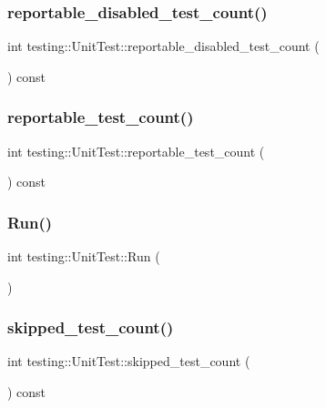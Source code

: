 \subsubsection{\texorpdfstring{reportable\+\_\+disabled\+\_\+test\+\_\+count()}{reportable\_disabled\_test\_count()}}
{\footnotesize\ttfamily int testing\+::\+Unit\+Test\+::reportable\+\_\+disabled\+\_\+test\+\_\+count (\begin{DoxyParamCaption}{ }\end{DoxyParamCaption}) const}

\mbox{\label{classtesting_1_1UnitTest_a449d0e0350ef146040cd37679c005248}} 
\subsubsection{\texorpdfstring{reportable\+\_\+test\+\_\+count()}{reportable\_test\_count()}}
{\footnotesize\ttfamily int testing\+::\+Unit\+Test\+::reportable\+\_\+test\+\_\+count (\begin{DoxyParamCaption}{ }\end{DoxyParamCaption}) const}

\mbox{\label{classtesting_1_1UnitTest_a2febc800536b44500565f4c423f359d3}} 
\subsubsection{\texorpdfstring{Run()}{Run()}}
{\footnotesize\ttfamily int testing\+::\+Unit\+Test\+::\+Run (\begin{DoxyParamCaption}{ }\end{DoxyParamCaption})}

\mbox{\label{classtesting_1_1UnitTest_a0082c74809be04baf7e43842ddac4ae5}} 
\subsubsection{\texorpdfstring{skipped\+\_\+test\+\_\+count()}{skipped\_test\_count()}}
{\footnotesize\ttfamily int testing\+::\+Unit\+Test\+::skipped\+\_\+test\+\_\+count (\begin{DoxyParamCaption}{ }\end{DoxyParamCaption}) const}

